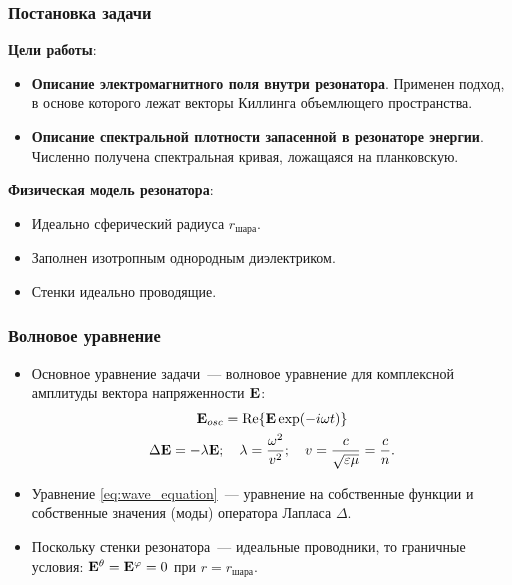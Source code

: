 \documentclass[compress]{beamer}
\begin{document}
    \begin{frame}\frametitle{Постановка задачи}

        \textbf{Цели работы}:
        \begin{itemize}
            \item \textbf{Описание электромагнитного поля внутри резонатора}.
                Применен подход, в основе которого лежат векторы Киллинга объемлющего пространства.
            \item \textbf{Описание спектральной плотности запасенной в резонаторе энергии}.
                Численно получена спектральная кривая, ложащаяся на планковскую.
        \end{itemize}

        \textbf{Физическая модель резонатора}:
        \begin{itemize}
            \item Идеально сферический радиуса $r_\text{шара}$.
            \item Заполнен изотропным однородным диэлектриком.
            \item Стенки идеально проводящие.
        \end{itemize}

    \end{frame}


    \begin{frame}\frametitle{Волновое уравнение}

        \begin{itemize}

            \item Основное уравнение задачи~--- волновое уравнение для комплексной амплитуды вектора напряженности $\mathbf{E}$:
            \begin{gather}
                \vb{E}_{osc} = \Re{\vb{E} \exp(-i \omega t)} \nonumber \\
                \Delta \mathbf{E} = - \lambda \mathbf{E} ; \quad
                    \lambda = \frac{\omega^2}{v^2} ; \quad
                    v = \frac{c}{\sqrt{\varepsilon\mu}} = \frac{c}{n} \label{eq:wave_equation}.
            \end{gather}

            \item Уравнение \autoref{eq:wave_equation}~--- уравнение на собственные функции и собственные значения (моды) оператора Лапласа $\Delta$.

            \item Поскольку стенки резонатора~--- идеальные проводники, то граничные условия: $\vb{E}^\theta = \vb{E}^\varphi = 0$ при $r = r_\text{шара}$.

        \end{itemize}

    \end{frame}
\end{document}
